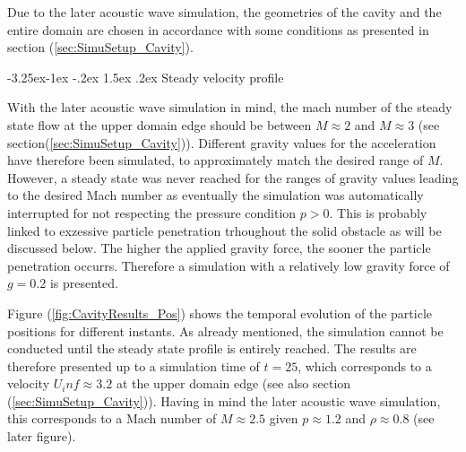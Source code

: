 \documentclass{report}
\makeatletter
\renewcommand\paragraph{\@startsection{paragraph}{4}{\z@}%
  {-3.25ex\@plus -1ex \@minus -.2ex}%
  {1.5ex \@plus .2ex}%
  {\normalfont\normalsize\bfseries}}
\makeatother
\begin{document}
Due to the later acoustic wave simulation, the geometries of the cavity and the entire domain are chosen in accordance with some conditions as presented in section (\ref{sec:SimuSetup_Cavity}). 

\paragraph{Steady velocity profile}

With the later acoustic wave simulation in mind, the mach number of the steady state flow at the upper domain edge should be between $M\approx2$ and $M\approx3$ (see section(\ref{sec:SimuSetup_Cavity})). Different gravity values for the acceleration have therefore been simulated, to approximately match the desired range of $M$. However, a steady state was never reached for the ranges of gravity values leading to the desired Mach number as eventually the simulation was automatically interrupted for not respecting the pressure condition $p>0$. This is probably linked to exzessive particle penetration trhoughout the solid obstacle as will be discussed below. 
The higher the applied gravity force, the sooner the particle penetration occurrs. Therefore a simulation with a relatively low gravity force of $g=0.2$ is presented.

Figure (\ref{fig:CavityResults_Pos}) shows the temporal evolution of the particle positions for different instants. As already mentioned, the simulation cannot be conducted until the steady state profile is entirely reached. The results are therefore presented up to a simulation time of $t=25$, which corresponds to a velocity $U_inf\approx3.2 $ at the upper domain edge (see also section (\ref{sec:SimuSetup_Cavity})). Having in mind the later acoustic wave simulation, this corresponds to a Mach number of $M\approx 2.5$ given $p\approx1.2$ and $\rho \approx0.8$ (see later figure).
\end{document}
